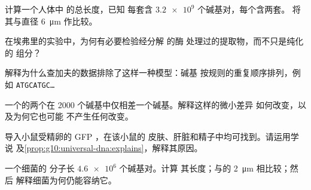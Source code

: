 \begin{exercise}[$\star\star$]\label{exo:g10:universal-dna:7}
计算一个人体中  的总长度，已知
每套含 $\num{3.2e9}$ 个碱基对，每个含两套。
将其与直径 \qty{6}{\micro m} 作比较。
\end{exercise}

\begin{exercise}[$\star\star$]\label{exo:g10:universal-dna:8}
在埃弗里的实验中，为何有必要检验经分解  的酶
处理过的提取物，而不只是纯化的 
组分？
\end{exercise}

\begin{exercise}[$\star\star$]\label{exo:g10:universal-dna:9}
解释为什么查加夫的数据排除了这样一种模型：碱基
按规则的重复顺序排列，例如 \texttt{ATGCATGC\dots}
\end{exercise}

\begin{exercise}[$\star\star$]\label{exo:g10:universal-dna:10}
一个的两个在 2000 个碱基中仅相差一个碱基。解释这样的微小差异
如何改变，以及为何它也可能
不产生任何改变。
\end{exercise}

\begin{exercise}[$\star\star$]\label{exo:g10:universal-dna:11}
导入小鼠受精卵的 GFP ，在该小鼠的
皮肤、肝脏和精子中均可找到。请运用学说
及\cref{prop:g10:universal-dna:explains}，解释其原因。
\end{exercise}

\begin{exercise}[$\star\star\star$]\label{exo:g10:universal-dna:12}
一个细菌的  分子长 $\num{4.6e6}$ 个碱基对。计算
其长度；与的 \qty{2}{\micro m} 相比较；然后
解释细菌为何仍能容纳它。
\end{exercise}

